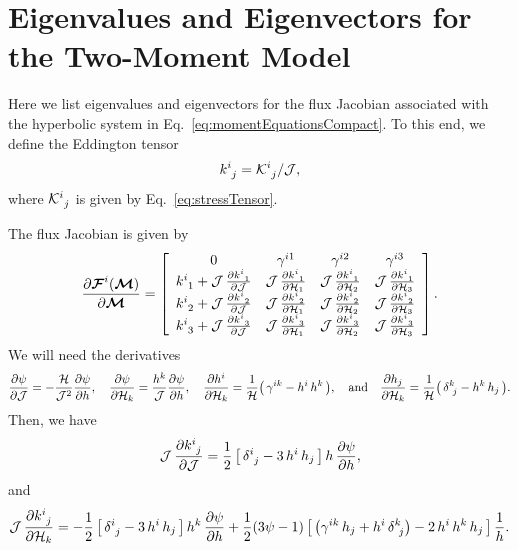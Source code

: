 \documentclass[10pt,preprint]{aastex}
\begin{document}



\appendix

\clearpage

\section{Eigenvalues and Eigenvectors for the Two-Moment Model}
\label{sec:eigenstructure}

Here we list eigenvalues and eigenvectors for the flux Jacobian associated with the hyperbolic system in Eq.~\eqref{eq:momentEquationsCompact}.  
To this end, we define the Eddington tensor
\begin{equation}
  k^{i}_{~j}=\mathcal{K}^{i}_{~j}/\mathcal{J},
\end{equation}
where $\mathcal{K}^{i}_{~j}$ is given by Eq.~\eqref{eq:stressTensor}.  

The flux Jacobian is given by
\begin{equation}
  \frac{\partial \boldsymbol{\mathcal{F}}^{i}(\boldsymbol{\mathcal{M}})}{\partial \boldsymbol{\mathcal{M}}}
  =\left[
  \begin{array}{cccc}
    0 & \gamma^{i1} & \gamma^{i2} & \gamma^{i3} \\
    k^{i}_{~1}+\mathcal{J}\,\frac{\partial k^{i}_{~1}}{\partial \mathcal{J}} & \mathcal{J}\,\frac{\partial k^{i}_{~1}}{\partial \mathcal{H}_{1}} & \mathcal{J}\,\frac{\partial k^{i}_{~1}}{\partial \mathcal{H}_{2}} & \mathcal{J}\,\frac{\partial k^{i}_{~1}}{\partial \mathcal{H}_{3}} \\
    k^{i}_{~2}+\mathcal{J}\,\frac{\partial k^{i}_{~2}}{\partial \mathcal{J}} & \mathcal{J}\,\frac{\partial k^{i}_{~2}}{\partial \mathcal{H}_{1}} & \mathcal{J}\,\frac{\partial k^{i}_{~2}}{\partial \mathcal{H}_{2}} & \mathcal{J}\,\frac{\partial k^{i}_{~2}}{\partial \mathcal{H}_{3}} \\
    k^{i}_{~3}+\mathcal{J}\,\frac{\partial k^{i}_{~3}}{\partial \mathcal{J}} & \mathcal{J}\,\frac{\partial k^{i}_{~3}}{\partial \mathcal{H}_{1}} & \mathcal{J}\,\frac{\partial k^{i}_{~3}}{\partial \mathcal{H}_{2}} & \mathcal{J}\,\frac{\partial k^{i}_{~3}}{\partial \mathcal{H}_{3}}
  \end{array}
  \right].  
\end{equation}
We will need the derivatives
\begin{equation}
  \frac{\partial \psi}{\partial \mathcal{J}}=-\frac{\mathcal{H}}{\mathcal{J}^{2}}\frac{\partial \psi}{\partial h},
  \quad
  \frac{\partial \psi}{\partial \mathcal{H}_{k}}=\frac{h^{k}}{\mathcal{J}}\frac{\partial \psi}{\partial h},
  \quad
  \frac{\partial h^{i}}{\partial \mathcal{H}_{k}}
  =\frac{1}{\mathcal{H}}\big(\,\gamma^{ik}-h^{i}\,h^{k}\,\big),
  \quad\text{and}\quad
  \frac{\partial h_{j}}{\partial \mathcal{H}_{k}}
  =\frac{1}{\mathcal{H}}\big(\,\delta^{k}_{~j}-h^{k}\,h_{j}\,\big).
\end{equation}
Then, we have
\begin{equation}
  \mathcal{J}\,\frac{\partial k^{i}_{~j}}{\partial \mathcal{J}}
  =\frac{1}{2}\,\big[\,\delta^{i}_{~j}-3\,h^{i}\,h_{j}\,\big]\,h\,\frac{\partial \psi}{\partial h},
\end{equation}
and
\begin{equation}
  \mathcal{J}\,\frac{\partial k^{i}_{~j}}{\partial \mathcal{H}_{k}}
  =-\frac{1}{2}\,\big[\,\delta^{i}_{~j}-3\,h^{i}\,h_{j}\,\big]\,h^{k}\,\frac{\partial \psi}{\partial h}
  +\frac{1}{2}(3\psi-1)\,\big[\,\big(\gamma^{ik}\,h_{j}+h^{i}\,\delta^{k}_{~j}\big)-2\,h^{i}\,h^{k}\,h_{j}\,\big]\,\frac{1}{h}.  
\end{equation}
\end{document}
